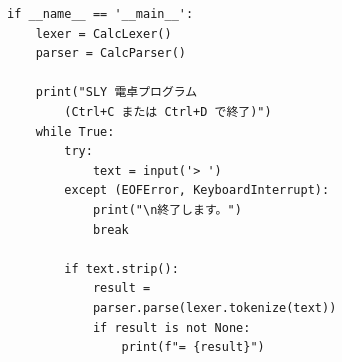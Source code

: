 \documentclass{jarticle}
\begin{document}
\begin{Verbatim}
if __name__ == '__main__':
    lexer = CalcLexer()
    parser = CalcParser()

    print("SLY 電卓プログラム
    	(Ctrl+C または Ctrl+D で終了)")
    while True:
        try:
            text = input('> ')
        except (EOFError, KeyboardInterrupt):
            print("\n終了します。")
            break

        if text.strip():
            result = 
	        parser.parse(lexer.tokenize(text))
            if result is not None:
                print(f"= {result}")
\end{Verbatim}
\end{document}
